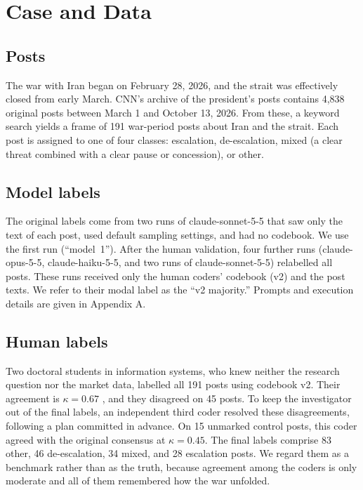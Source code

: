 \documentclass[12pt]{article}
\begin{document}
\section{Case and Data}

\subsection{Posts}
The war with Iran began on February 28, 2026, and the strait was effectively closed from early March. CNN's archive of the president's posts contains 4,838 original posts between March 1 and October 13, 2026. From these, a keyword search yields a frame of 191 war-period posts about Iran and the strait. Each post is assigned to one of four classes: escalation, de-escalation, mixed (a clear threat combined with a clear pause or concession), or other.

\subsection{Model labels}
The original labels come from two runs of claude-sonnet-5-5 that saw only the text of each post, used default sampling settings, and had no codebook. We use the first run (``model~1''). After the human validation, four further runs (claude-opus-5-5, claude-haiku-5-5, and two runs of claude-sonnet-5-5) relabelled all posts. These runs received only the human coders' codebook (v2) and the post texts. We refer to their modal label as the ``v2 majority.'' Prompts and execution details are given in Appendix A.

\subsection{Human labels}
Two doctoral students in information systems, who knew neither the research question nor the market data, labelled all 191 posts using codebook v2. Their agreement is $\kappa = 0.67$ \citep{cohen1960}, and they disagreed on 45 posts. To keep the investigator out of the final labels, an independent third coder resolved these disagreements, following a plan committed in advance. On 15 unmarked control posts, this coder agreed with the original consensus at $\kappa = 0.45$. The final labels comprise 83 other, 46 de-escalation, 34 mixed, and 28 escalation posts. We regard them as a benchmark rather than as the truth, because agreement among the coders is only moderate and all of them remembered how the war unfolded.
\end{document}
